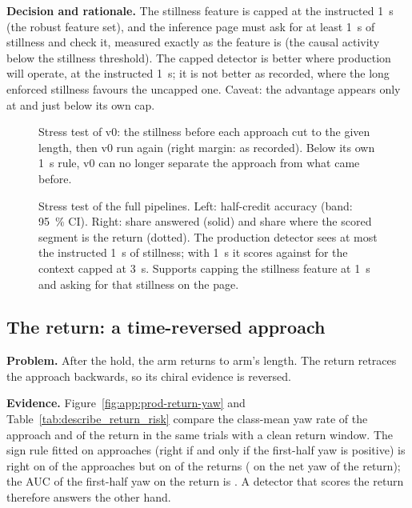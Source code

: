 \textbf{Decision and rationale.}
The stillness feature is capped at the instructed 1~s (the robust feature set), and the inference page must ask for at least 1~s of stillness and check it, measured exactly as the feature is (the causal activity below the stillness threshold).
The capped detector is better where production will operate, at the instructed 1~s; it is not better as recorded, where the long enforced stillness favours the uncapped one.
Caveat: the advantage appears only at and just below its own cap.

\begin{figure}[htbp]
  \centering
  \caption{Stress test of v0: the stillness before each approach cut to the given length, then v0 run again (right margin: as recorded). Below its own 1~s rule, v0 can no longer separate the approach from what came before.}
  \label{fig:S2_19_cuefree_stress}\label{fig:app:prod-v0-stress}
\end{figure}
\begin{figure}[htbp]
  \centering
  \caption{Stress test of the full pipelines. Left: half-credit accuracy (band: 95~\% CI). Right: share answered (solid) and share where the scored segment is the return (dotted). The production detector sees at most the instructed 1~s of stillness; with 1~s it scores  against  for the context capped at 3~s. Supports capping the stillness feature at 1~s and asking for that stillness on the page.}
  \label{fig:M4_03_stress}\label{fig:app:prod-stress}
\end{figure}
{\renewcommand{\arraystretch}{0.9}}
\FloatBarrier

\subsection{The return: a time-reversed approach}\label{app:prod:return}

\textbf{Problem.}
After the hold, the arm returns to arm's length.
The return retraces the approach backwards, so its chiral evidence is reversed.

\textbf{Evidence.}
Figure~\ref{fig:app:prod-return-yaw} and Table~\ref{tab:describe_return_risk} compare the class-mean yaw rate of the approach and of the return in the same  trials with a clean return window.
The sign rule fitted on approaches (right if and only if the first-half yaw is positive) is right on  of the approaches but on  of the returns ( on the net yaw of the return); the AUC of the first-half yaw on the return is .
A detector that scores the return therefore answers the other hand.

